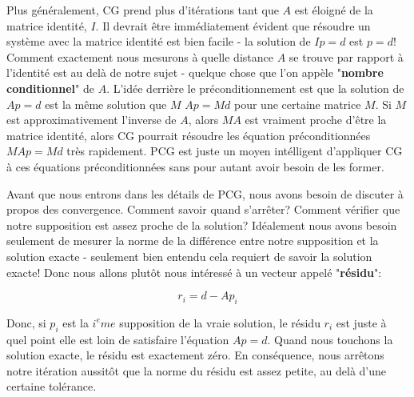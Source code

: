 \documentclass[11pt]{report}
\begin{document}
Plus généralement, CG prend plus d'itérations tant que $A$ est éloigné de la matrice identité, $I$. Il devrait être immédiatement évident que résoudre un système avec la matrice identité est bien facile - la solution de $Ip = d$ est $p = d$! Comment exactement nous mesurons à quelle distance $A$ se trouve par rapport à l'identité est au delà de notre sujet - quelque chose que l'on appèle "\textbf{nombre conditionnel}" de $A$. L'idée derrière le préconditionnement est que la solution de $Ap = d$ est la même solution que $M\,\,Ap=Md$ pour une certaine matrice $M$. Si $M$ est approximativement l'inverse de $A$, alors $MA$ est vraiment proche d'être la matrice identité, alors CG pourrait résoudre les équation préconditionnées $MAp = Md$ très rapidement. PCG est juste un moyen intélligent d'appliquer CG à ces équations préconditionnées sans pour autant avoir besoin de les former. \newline
 
Avant que nous entrons dans les détails de PCG, nous avons besoin de discuter à propos des convergence. Comment savoir quand s'arrêter? Comment vérifier que notre supposition est assez proche de la solution? Idéalement nous avons besoin seulement de mesurer la norme de la différence entre notre supposition et la solution exacte - seulement bien entendu cela requiert de savoir la solution exacte! Donc nous allons plutôt nous intéressé à un vecteur appelé "\textbf{résidu}":

\begin{equation}
r_i = d - Ap_i
\end{equation}

Donc, si $p_i$ est la $i^eme$ supposition de la vraie solution, le résidu $r_i$ est juste à quel point elle est loin de satisfaire l'équation $Ap=d$. Quand nous touchons la solution exacte, le résidu est exactement zéro. En conséquence, nous arrêtons notre itération aussitôt que la norme du résidu est assez petite, au delà d'une certaine tolérance. \newline
\end{document}
